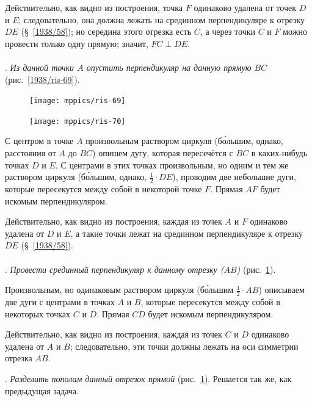 \documentclass[oneside]{book}
\begin{document}
Действительно, как видно из построения, точка $F$ одинаково удалена от точек $D$ и $E$;
следовательно, она должна лежать на срединном перпендикуляре к отрезку $DE$ (§~\ref{1938/58});
но середина этого отрезка есть $C$, а через точки $C$ и $F$ можно провести только одну прямую;
значит, $FC \perp DE$.

\paragraph{}\label{1938/66}
.
\emph{Из данной точки $A$ опустить перпендикуляр на данную прямую $BC$} (рис.~\ref{1938/ris-69}).

\begin{figure}
\centering
\texttt{[image: mppics/ris-69]}
\caption{}\label{1938/ris-69}
\bigskip
\texttt{[image: mppics/ris-70]}
\caption{}\label{1938/ris-70}
\end{figure}

С центром в точке $A$ произвольным раствором циркуля (б\'{о}льшим, однако, расстояния от $A$ до $BC$) опишем дугу, которая пересечётся с $BC$ в каких-нибудь точках $D$ и $E$.
С центрами в этих точках произвольным, но одним и тем же раствором циркуля (б\'{о}льшим, однако, $\tfrac12\cdot DE$), проводим две небольшие дуги, которые пересекутся между собой в некоторой точке $F$.
Прямая $AF$ будет искомым перпендикуляром.

Действительно, как видно из построения, каждая из точек $A$ и $F$ одинаково удалена от $D$ и $E$, а такие точки лежат на срединном перпендикуляре к отрезку $DE$ (§~\ref{1938/58}).

\paragraph{}\label{1938/67}
\mbox{.}
\emph{Провести срединный перпендикуляр к данному отрезку \emph{($AB$)}} (рис.~\ref{1938/ris-70}).

Произвольным, но одинаковым раствором циркуля (б\'{о}льшим $\tfrac12\cdot AB$) описываем две дуги с центрами в точках $A$ и $B$, которые пересекутся между собой в некоторых точках $C$ и $D$.
Прямая $CD$ будет искомым перпендикуляром.

Действительно, как видно из построения, каждая из точек $C$ и $D$ одинаково удалена от $A$ и $B$;
следовательно, эти точки должны лежать на оси симметрии отрезка $AB$.

.
\emph{Разделить пополам данный отрезок прямой} (рис.~\ref{1938/ris-70}).
Решается так же, как предыдущая задача.
\end{document}
